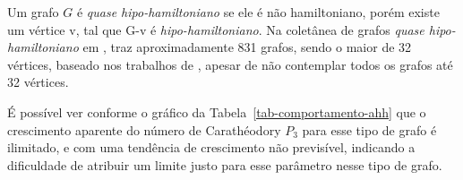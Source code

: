 Um grafo $G$ é \textit{quase hipo-hamiltoniano} se ele é não hamiltoniano, porém
existe um vértice v, tal que G-v é \textit{hipo-hamiltoniano}.
Na coletânea de grafos \textit{quase hipo-hamiltoniano} em \cite{hog2013},
traz aproximadamente 831 grafos, sendo o maior de 32 vértices,
baseado nos trabalhos de \cite{Goedgebeur2016},
apesar de não contemplar todos os grafos até 32 vértices.

É possível ver conforme o gráfico da Tabela~\ref{tab-comportamento-ahh} 
que o crescimento aparente do número de Carathéodory $P_3$
para esse tipo de grafo é ilimitado, 
e com uma tendência de crescimento não previsível, 
indicando a dificuldade de atribuir um limite justo para
esse parâmetro nesse tipo de grafo.

\begin{multicols}{2}
\centering
{}
\end{multicols}
